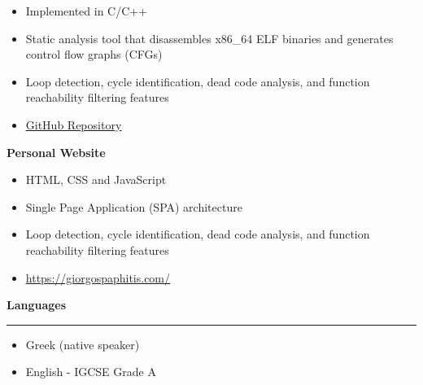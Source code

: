 \documentclass[12pt]{article}
\begin{document}
{\renewcommand{\labelitemi}{\textcolor{bgcolor}{\normalsize$\bullet$}}%
   \begin{itemize}[leftmargin=33pt, itemsep=0pt, topsep=0pt]
      \item Implemented in C/C++\\
      \item Static analysis tool that disassembles x86\_64 ELF binaries and generates control flow graphs (CFGs)\\
      \item Loop detection, cycle identification, dead code analysis, and function reachability filtering features\\
      \item \href{https://github.com/gpaphitis/CFGAnalyzer}{\underline{GitHub Repository}}\\
   \end{itemize}
}
\vspace{0.5cm}
\textbf{\textcolor{bgcolor}{Personal Website}}\\[0.5em]
{\renewcommand{\labelitemi}{\textcolor{bgcolor}{\normalsize$\bullet$}}%
   \begin{itemize}[leftmargin=33pt, itemsep=0pt, topsep=0pt]
      \item HTML, CSS and JavaScript\\
      \item Single Page Application (SPA) architecture\\
      \item Loop detection, cycle identification, dead code analysis, and function reachability filtering features\\
      \item \href{https://giorgospaphitis.com/}{\underline{https://giorgospaphitis.com/}}\\
   \end{itemize}
}
\vspace{1cm}
{\fontsize{14pt}{13pt}\selectfont
   \textbf{\textcolor{bgcolor}{Languages}}\\[0.3em]
}
\hrule
\vspace{0.5cm}
{\renewcommand{\labelitemi}{\textcolor{bgcolor}{\normalsize$\bullet$}}%
   \begin{itemize}[leftmargin=13pt, itemsep=0pt, topsep=0pt]
      \item Greek (native speaker)\\
      \item English - IGCSE Grade A\\
   \end{itemize}
}
\end{document}
